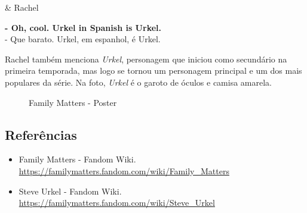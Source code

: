 \begin{tcolorbox}[enhanced,center upper,
    drop fuzzy shadow southeast, boxrule=0.3pt,
    lower separated=false,
    colframe=black!30!dialogoBorder,colback=white]
\begin{minipage}[c]{0.16\linewidth}
   & \centering \scriptsize{Rachel}
\end{minipage}
\hfill
\begin{minipage}[c]{0.8\linewidth}
  \textbf{- Oh, cool. Urkel in Spanish is Urkel.}\\
  - Que barato. Urkel, em espanhol, é Urkel.
\end{minipage}
\end{tcolorbox}

Rachel também menciona \emph{Urkel}, personagem que iniciou como
secundário na primeira temporada, mas logo se tornou um personagem
principal e um dos mais populares da série. Na foto, \emph{Urkel} é o
garoto de óculos e camisa amarela.

\begin{figure}
  \centering
    \caption{Family Matters - Poster\label{fig:family-matters-poster}}
\end{figure}

\hypertarget{referuxeancias-2}{%
\subsection{Referências}\label{referuxeancias-2}}

\begin{itemize}
\tightlist
\item
  \sloppy Family Matters - Fandom Wiki. \url{https://familymatters.fandom.com/wiki/Family_Matters}
\item
  \sloppy Steve Urkel - Fandom Wiki. \url{https://familymatters.fandom.com/wiki/Steve_Urkel}
\end{itemize}

